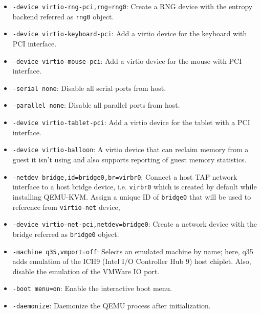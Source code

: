 \documentclass[a4paper,12pt, final]{report}
\begin{document}
\begin{itemize}
    \item \texttt{-device virtio-rng-pci,rng=rng0}: Create a RNG device with the entropy backend referred as \verb|rng0| object.
    \item \texttt{-device virtio-keyboard-pci}: Add a virtio device for the keyboard with PCI interface.
    \item \texttt{-device virtio-mouse-pci}: Add a virtio device for the mouse with PCI interface.
    \item \texttt{-serial none}: Disable all serial ports from host.
    \item \texttt{-parallel none}: Disable all parallel ports from host.
    \item \texttt{-device virtio-tablet-pci}: Add a virtio device for the tablet with a PCI interface.
    \item \texttt{-device virtio-balloon}: A virtio device that can reclaim memory from a guest it isn't using and also supports reporting of guest memory statistics.
    \item \texttt{-netdev bridge,id=bridge0,br=virbr0}: Connect a host TAP network interface to a host bridge device, i.e. \verb|virbr0| which is created by default while installing QEMU-KVM. Assign a unique ID of \verb|bridge0| that will be used to reference from \verb|virtio-net| device,
    \item \texttt{-device virtio-net-pci,netdev=bridge0}: Create a network device with the bridge referred as \verb|bridge0| object.
    \item \texttt{-machine q35,vmport=off}: Selects an emulated machine by name; here, q35 adds emulation of the ICH9 (Intel I/O Controller Hub 9) host chiplet. Also, disable the emulation of the VMWare IO port.
    \item \texttt{-boot menu=on}: Enable the interactive boot menu.
    \item \texttt{-daemonize}: Daemonize the QEMU process after initialization.
\end{itemize}

\end{document}
